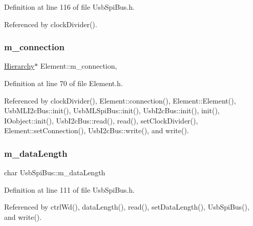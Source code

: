 Definition at line 116 of file Usb\+Spi\+Bus.\+h.



Referenced by clock\+Divider().

\mbox{\label{classElement_abe3de7a5dbbc9a6dd2d7e012e5fdb266}} 
\subsubsection{\texorpdfstring{m\+\_\+connection}{m\_connection}}
{\footnotesize\ttfamily \hyperlink{classHierarchy}{Hierarchy}$\ast$ Element\+::m\+\_\+connection\hspace{0.3cm}{\ttfamily [protected]}, {\ttfamily [inherited]}}



Definition at line 70 of file Element.\+h.



Referenced by clock\+Divider(), Element\+::connection(), Element\+::\+Element(), Usb\+M\+L\+I2c\+Bus\+::init(), Usb\+M\+L\+Spi\+Bus\+::init(), Usb\+I2c\+Bus\+::init(), init(), I\+Oobject\+::init(), Usb\+I2c\+Bus\+::read(), read(), set\+Clock\+Divider(), Element\+::set\+Connection(), Usb\+I2c\+Bus\+::write(), and write().

\mbox{\label{classUsbSpiBus_a2d8b2bddd6d4d5dc53c38b5698737c5c}} 
\subsubsection{\texorpdfstring{m\+\_\+data\+Length}{m\_dataLength}}
{\footnotesize\ttfamily char Usb\+Spi\+Bus\+::m\+\_\+data\+Length\hspace{0.3cm}{\ttfamily [private]}}



Definition at line 111 of file Usb\+Spi\+Bus.\+h.



Referenced by ctrl\+Wd(), data\+Length(), read(), set\+Data\+Length(), Usb\+Spi\+Bus(), and write().

\mbox{\label{classUsbSpiBus_a23011787b0425356b011bc7a1c7cff5b}} 
